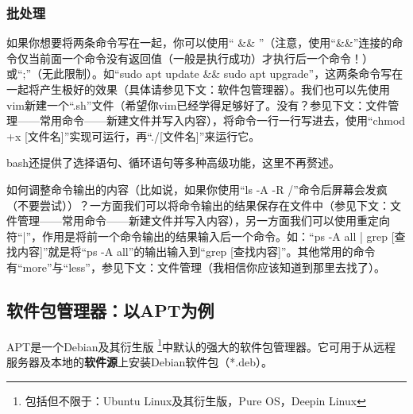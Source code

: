 \documentclass{book}
\begin{document}
\subsubsection{批处理}
如果你想要将两条命令写在一起，你可以使用“ \&\& ”（注意，使用“\&\&”连接的命令仅当前面一个命令没有返回值（一般是执行成功）才执行后一个命令！）或“;”（无此限制）。如“sudo apt update \&\& sudo apt upgrade”，这两条命令写在一起将产生极好的效果（具体请参见下文：软件包管理器）。我们也可以先使用vim新建一个“.sh”文件（希望你vim已经学得足够好了。没有？参见下文：文件管理——常用命令——新建文件并写入内容），将命令一行一行写进去，使用“chmod +x [文件名]”实现可运行，再“./[文件名]”来运行它。\par
bash还提供了选择语句、循环语句等多种高级功能，这里不再赘述。\par
如何调整命令输出的内容（比如说，如果你使用“ls -A -R /”命令后屏幕会发疯（不要尝试））？一方面我们可以将命令输出的结果保存在文件中（参见下文：文件管理——常用命令——新建文件并写入内容），另一方面我们可以使用重定向符“|”，作用是将前一个命令输出的结果输入后一个命令。如：“ps -A  all | grep [查找内容]”就是将“ps -A all”的输出输入到“grep [查找内容]”。其他常用的命令有“more”与“less”，参见下文：文件管理（我相信你应该知道到那里去找了）。
\subsection{软件包管理器：以APT为例}
APT是一个Debian及其衍生版 \footnote{包括但不限于：Ubuntu Linux及其衍生版，Pure OS，Deepin Linux}中默认的强大的软件包管理器。它可用于从远程服务器及本地的\textbf{软件源}上安装Debian软件包（*.deb）。
\end{document}
